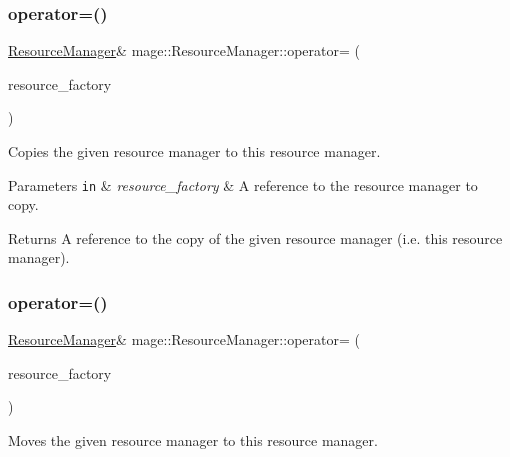 \subsubsection{\texorpdfstring{operator=()}{operator=()}\hspace{0.1cm}{\footnotesize\ttfamily [1/2]}}
{\footnotesize\ttfamily \hyperlink{classmage_1_1_resource_manager}{Resource\+Manager}\& mage\+::\+Resource\+Manager\+::operator= (\begin{DoxyParamCaption}\item[{const \hyperlink{classmage_1_1_resource_manager}{Resource\+Manager} \&}]{resource\+\_\+factory }\end{DoxyParamCaption})\hspace{0.3cm}{\ttfamily [delete]}}

Copies the given resource manager to this resource manager.


\begin{DoxyParams}[1]{Parameters}
\mbox{\tt in}  & {\em resource\+\_\+factory} & A reference to the resource manager to copy. \\
\hline
\end{DoxyParams}
\begin{DoxyReturn}{Returns}
A reference to the copy of the given resource manager (i.\+e. this resource manager). 
\end{DoxyReturn}
\hypertarget{classmage_1_1_resource_manager_a0a418c5753af2b4a0a868801f3145f0a}{}\label{classmage_1_1_resource_manager_a0a418c5753af2b4a0a868801f3145f0a} 
\subsubsection{\texorpdfstring{operator=()}{operator=()}\hspace{0.1cm}{\footnotesize\ttfamily [2/2]}}
{\footnotesize\ttfamily \hyperlink{classmage_1_1_resource_manager}{Resource\+Manager}\& mage\+::\+Resource\+Manager\+::operator= (\begin{DoxyParamCaption}\item[{\hyperlink{classmage_1_1_resource_manager}{Resource\+Manager} \&\&}]{resource\+\_\+factory }\end{DoxyParamCaption})\hspace{0.3cm}{\ttfamily [delete]}}

Moves the given resource manager to this resource manager.


